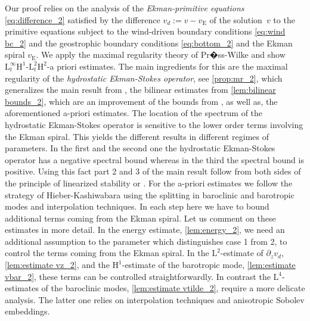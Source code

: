 \documentclass[preprint]{elsarticle}
\numberwithin{equation}{section}
\renewcommand{\H}{\mathrm{H}}
\newcommand{\rL}{\mathrm{L}}
\newcommand{\rH}{\H}
\newcommand{\rE}{\mathrm{E}}
\begin{document}
\smallskip 

Our proof relies on the analysis of the  \emph{Ekman-primitive equations} \eqref{eq:difference_2} satisfied by the difference $v_d := v - v_{\rE}$ of the solution~$v$ to the primitive equations subject to the wind-driven boundary conditions \eqref{eq:wind bc_2} and the geostrophic boundary conditions \eqref{eq:bottom_2} and the Ekman spiral $v_{\rE}$. 
We apply the maximal regularity theory of Pr�ss-Wilke \cite{PW:17_2,PWS:18_2} and show $\rL^\infty_t \rH^1$-$\rL^2_t \rH^{2}$-a priori estimates. The main ingredients for this are the maximal regularity of the \emph{hydrostatic Ekman-Stokes operator}, see \autoref{prop:mr_2}, which generalizes the main result from \cite{GGHHK:17_2}, the bilinear estimates from \autoref{lem:bilinear bounds_2}, which are an improvement of the bounds from \cite{GGHHK:20_2}, as well as, the aforementioned a-priori estimates. The location of the spectrum of the hydrostatic Ekman-Stokes operator is sensitive to the lower order terms involving the Ekman spiral. This yields the different results in different regimes of parameters. In the first and the second one the hydrostatic Ekman-Stokes operator has a negative spectral bound whereas in the third the spectral bound is positive. Using this fact part 2 and 3 of the main result follow from both sides of the principle of linearized stability \cite[Section 5]{PS:16_2} or \cite{PSZ:09_2}. 
For the a-priori estimates we follow the strategy of Hieber-Kashiwabara \cite{HK:16_2} using the splitting in baroclinic and barotropic modes and interpolation techniques. In each step here we have to bound additional terms coming from the Ekman spiral. 
Let us comment on these estimates in more detail. 
In the energy estimate, \autoref{lem:energy_2}, we need an additional assumption to the parameter which distinguishes case 1 from 2, to control the terms coming from the Ekman spiral. 
In the  $\rL^2$-estimate of $\partial_z v_d$, \autoref{lem:estimate vz_2}, and the $\rH^1$-estimate of the barotropic mode, \autoref{lem:estimate vbar_2}, these terms can be controlled straightforwardly. In contrast the $\rL^4$-estimates of the baroclinic modes, \autoref{lem:estimate vtilde_2}, require a more delicate analysis. The latter one relies on interpolation techniques and anisotropic Sobolev embeddings.
\end{document}
